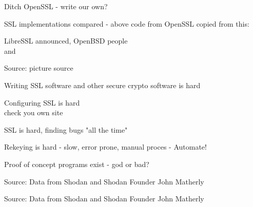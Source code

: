 \documentclass[20pt,landscape,a4paper,footrule]{foils}
\begin{document}
\begin{list1}
\item Ditch OpenSSL - write our own?
\item SSL implementations compared - above code from OpenSSL copied from this:\\
\item LibreSSL announced, OpenBSD people\\
  and 
\end{list1}


Source: picture source\\ {\footnotesize{}}
\begin{list2}
\item Writing SSL software and other secure crypto software is hard
\item Configuring SSL is hard\\
check you own site 
\item SSL is hard, finding bugs "all the time"
\item Rekeying is hard - slow, error prone, manual proces - Automate!
\item Proof of concept programs exist - god or bad?
\end{list2}



Source: Data from Shodan and Shodan Founder John Matherly




Source: Data from Shodan and Shodan Founder John Matherly


\end{document}

